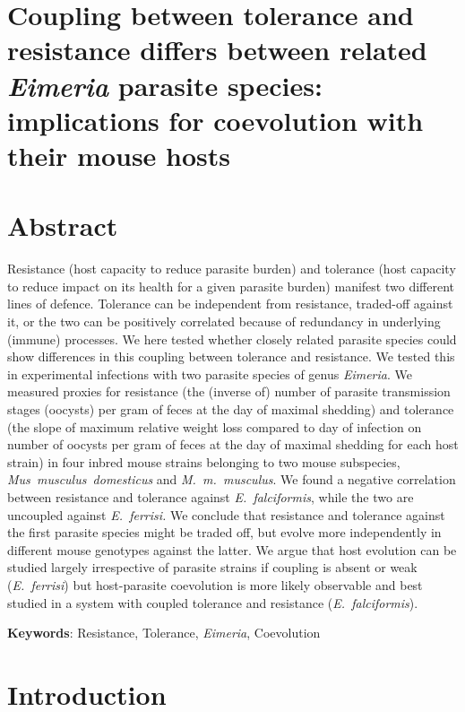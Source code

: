 \documentclass[12pt]{article}
\begin{document}
\section*{Coupling between tolerance and resistance differs between related \textit{Eimeria} parasite species: implications for coevolution with their mouse hosts}

\section*{Abstract}
Resistance (host capacity to reduce parasite burden) and tolerance (host capacity to reduce impact on its health for a given parasite burden) manifest two different lines of defence. Tolerance can be independent from resistance, traded-off against it, or the two can be positively correlated because of redundancy in underlying (immune) processes. We here tested whether closely related parasite species could show differences in this coupling between tolerance and resistance. 
We tested this in experimental infections with two parasite species of genus \textit{Eimeria}. We measured proxies for resistance (the (inverse of) number of parasite transmission stages (oocysts) per gram of feces at the day of maximal shedding) and tolerance (the slope of maximum relative weight loss compared to day of infection on number of oocysts per gram of feces at the day of maximal shedding for each host strain) in four inbred mouse strains belonging to two mouse subspecies, \textit{Mus~musculus~domesticus} and \textit{M.~m.~musculus}.
We found a negative correlation between resistance and tolerance against \textit{E.~falciformis}, while the two are uncoupled against \textit{E.~ferrisi.} We conclude that resistance and tolerance against the first parasite species might be traded off, but evolve more independently in different mouse genotypes against the latter. We argue that host evolution can be studied largely irrespective of parasite strains if coupling is absent or weak (\textit{E.~ferrisi}) but host-parasite coevolution is more likely observable and best studied in a system with coupled tolerance and resistance (\textit{E.~falciformis}). 

\textbf{Keywords}: Resistance, Tolerance, \textit{Eimeria}, Coevolution

\section*{Introduction}
\end{document}
